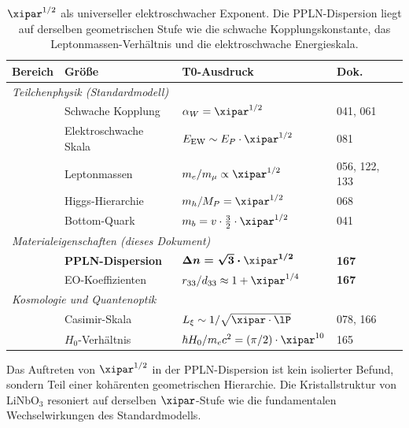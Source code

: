 \begin{table}[H]
    \centering
    \begin{tabular}{llll}
        \toprule
        \textbf{Bereich} & \textbf{Größe} &
        \textbf{T0-Ausdruck} & \textbf{Dok.} \\
        \midrule
        \multicolumn{4}{l}{\itshape Teilchenphysik (Standardmodell)} \\[2pt]
        & Schwache Kopplung   & $\alpha_W = \xipar^{1/2}$
            & 041, 061 \\
        & Elektroschwache Skala & $E_\mathrm{EW} \sim E_P\cdot\xipar^{1/2}$
            & 081 \\
        & Leptonmassen        & $m_e/m_\mu \propto \xipar^{1/2}$
            & 056, 122, 133 \\
        & Higgs-Hierarchie    & $m_h/M_P = \xipar^{1/2}$
            & 068 \\
        & Bottom-Quark        & $m_b = v\cdot\tfrac{3}{2}\cdot\xipar^{1/2}$
            & 041 \\
        \midrule
        \multicolumn{4}{l}{\itshape Materialeigenschaften (dieses Dokument)} \\[2pt]
        & \textbf{PPLN-Dispersion}
            & $\boldsymbol{\Delta n = \sqrt{3}\cdot\xipar^{1/2}}$
            & \textbf{167} \\
        & EO-Koeffizienten
            & $r_{33}/d_{33} \approx 1 + \xipar^{1/4}$
            & \textbf{167} \\
        \midrule
        \multicolumn{4}{l}{\itshape Kosmologie und Quantenoptik} \\[2pt]
        & Casimir-Skala       & $L_\xi \sim 1/\sqrt{\xipar\cdot\lP}$
            & 078, 166 \\
        & $H_0$-Verhältnis    & $\hbar H_0/m_ec^2 = (\pi/2)\cdot\xipar^{10}$
            & 165 \\
        \bottomrule
    \end{tabular}
    \caption{$\xipar^{1/2}$ als universeller elektroschwacher Exponent.
    Die PPLN-Dispersion liegt auf derselben geometrischen Stufe wie die
    schwache Kopplungskonstante, das Leptonmassen-Verhältnis und die
    elektroschwache Energieskala.}
    \label{tab:universal}
\end{table}

Das Auftreten von $\xipar^{1/2}$ in der PPLN-Dispersion ist kein
isolierter Befund, sondern Teil einer kohärenten geometrischen Hierarchie.
Die Kristallstruktur von LiNbO$_3$ resoniert auf derselben $\xipar$-Stufe
wie die fundamentalen Wechselwirkungen des Standardmodells.

